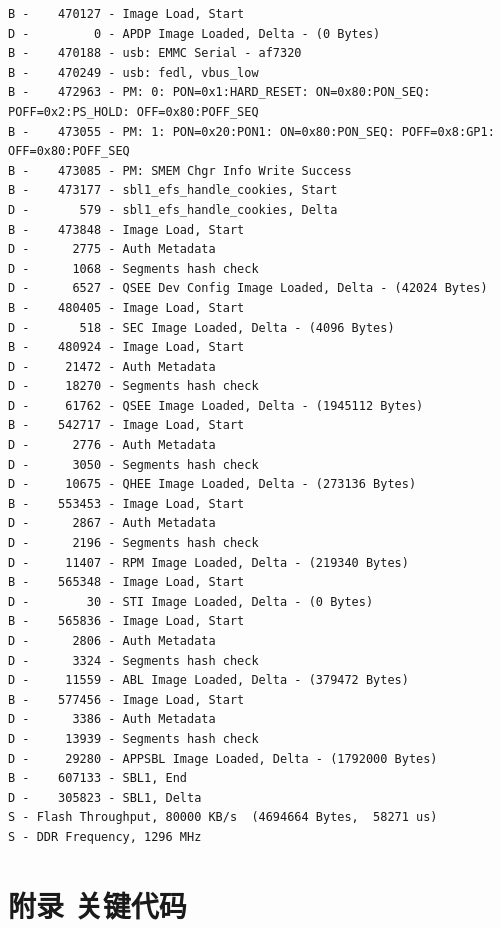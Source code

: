 \begin{lstlisting}
B -    470127 - Image Load, Start
D -         0 - APDP Image Loaded, Delta - (0 Bytes)
B -    470188 - usb: EMMC Serial - af7320
B -    470249 - usb: fedl, vbus_low
B -    472963 - PM: 0: PON=0x1:HARD_RESET: ON=0x80:PON_SEQ: POFF=0x2:PS_HOLD: OFF=0x80:POFF_SEQ
B -    473055 - PM: 1: PON=0x20:PON1: ON=0x80:PON_SEQ: POFF=0x8:GP1: OFF=0x80:POFF_SEQ
B -    473085 - PM: SMEM Chgr Info Write Success
B -    473177 - sbl1_efs_handle_cookies, Start
D -       579 - sbl1_efs_handle_cookies, Delta
B -    473848 - Image Load, Start
D -      2775 - Auth Metadata
D -      1068 - Segments hash check
D -      6527 - QSEE Dev Config Image Loaded, Delta - (42024 Bytes)
B -    480405 - Image Load, Start
D -       518 - SEC Image Loaded, Delta - (4096 Bytes)
B -    480924 - Image Load, Start
D -     21472 - Auth Metadata
D -     18270 - Segments hash check
D -     61762 - QSEE Image Loaded, Delta - (1945112 Bytes)
B -    542717 - Image Load, Start
D -      2776 - Auth Metadata
D -      3050 - Segments hash check
D -     10675 - QHEE Image Loaded, Delta - (273136 Bytes)
B -    553453 - Image Load, Start
D -      2867 - Auth Metadata
D -      2196 - Segments hash check
D -     11407 - RPM Image Loaded, Delta - (219340 Bytes)
B -    565348 - Image Load, Start
D -        30 - STI Image Loaded, Delta - (0 Bytes)
B -    565836 - Image Load, Start
D -      2806 - Auth Metadata
D -      3324 - Segments hash check
D -     11559 - ABL Image Loaded, Delta - (379472 Bytes)
B -    577456 - Image Load, Start
D -      3386 - Auth Metadata
D -     13939 - Segments hash check
D -     29280 - APPSBL Image Loaded, Delta - (1792000 Bytes)
B -    607133 - SBL1, End
D -    305823 - SBL1, Delta
S - Flash Throughput, 80000 KB/s  (4694664 Bytes,  58271 us)
S - DDR Frequency, 1296 MHz
\end{lstlisting}


\section{ 附录 关键代码}


